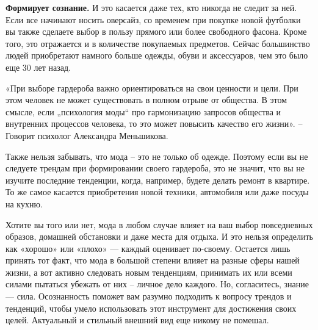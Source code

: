 \textbf{Формирует сознание.}
И это касается даже тех, кто никогда не следит за ней. Если все начинают носить оверсайз, со временем при покупке новой футболки вы также сделаете выбор в пользу прямого или более свободного фасона. Кроме того, это отражается и в количестве покупаемых предметов. Сейчас большинство людей приобретают намного больше одежды, обуви и аксессуаров, чем это было еще 30 лет назад.

\begin{fancyquotes}
    «При выборе гардероба важно ориентироваться на свои ценности и цели. При этом человек не может существовать в полном отрыве от общества. В этом смысле, если „психология моды“ про гармонизацию запросов общества и внутренних процессов человека, то это может повысить качество его жизни». – Говорит психолог Александра Меньшикова.
\end{fancyquotes}

Также нельзя забывать, что мода – это не только об одежде. Поэтому если вы не следуете трендам при формировании своего гардероба, это не значит, что вы не изучите последние тенденции, когда, например, будете делать ремонт в квартире. То же самое касается приобретения новой техники, автомобиля или даже посуды на кухню.

Хотите вы того или нет, мода в любом случае влияет на ваш выбор повседневных образов, домашней обстановки и даже места для отдыха. И это нельзя определить как «хорошо» или «плохо» — каждый оценивает по-своему. Остается лишь принять тот факт, что мода в большой степени влияет на разные сферы нашей жизни, а вот активно следовать новым тенденциям, принимать их или всеми силами пытаться убежать от них – личное дело каждого. Но, согласитесь, знание — сила. Осознанность поможет вам разумно подходить к вопросу трендов и тенденций, чтобы умело использовать этот инструмент для достижения своих целей. Актуальный и стильный внешний вид еще никому не помешал.